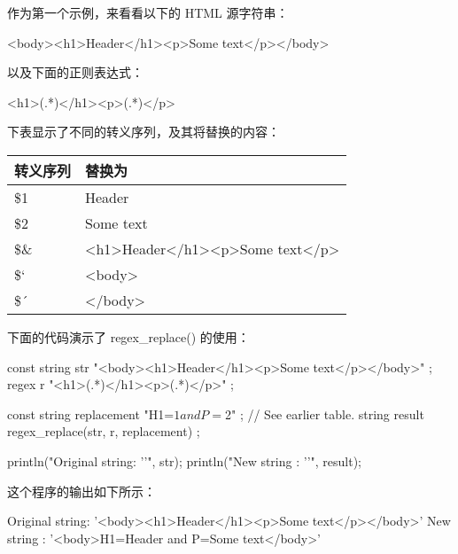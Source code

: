 作为第一个示例，来看看以下的 HTML 源字符串：

\begin{shell}
<body><h1>Header</h1><p>Some text</p></body>
\end{shell}

以及下面的正则表达式：

\begin{cpp}
<h1>(.*)</h1><p>(.*)</p>
\end{cpp}

下表显示了不同的转义序列，及其将替换的内容：

\begin{longtable}{|l|l|}
\hline
\textbf{转义序列} & \textbf{替换为}         \\ \hline
\endfirsthead
%
\endhead
%
\$1                      & Header                         \\ \hline
\$2                      & Some text                      \\ \hline
\$\& & \textless{}h1\textgreater{}Header\textless{}/h1\textgreater{}\textless{}p\textgreater{}Some text\textless{}/p\textgreater{} \\ \hline
\$`                      & \textless{}body\textgreater{}  \\ \hline
\$´                      & \textless{}/body\textgreater{} \\ \hline
\end{longtable}

下面的代码演示了 regex\_replace() 的使用：

\begin{cpp}
const string str { "<body><h1>Header</h1><p>Some text</p></body>" };
regex r { "<h1>(.*)</h1><p>(.*)</p>" };

const string replacement { "H1=$1 and P=$2" }; // See earlier table.
string result { regex_replace(str, r, replacement) };

println("Original string: '{}'", str);
println("New string : '{}'", result);
\end{cpp}

这个程序的输出如下所示：

\begin{shell}
Original string: '<body><h1>Header</h1><p>Some text</p></body>'
New string     : '<body>H1=Header and P=Some text</body>'
\end{shell}

